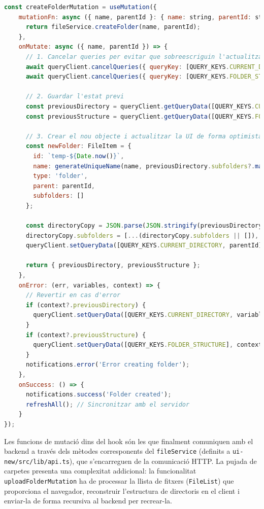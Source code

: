 \begin{lstlisting}[language=javascript, caption={Implementació d'una mutació optimista a `useFileOperations.ts`}]
const createFolderMutation = useMutation({
    mutationFn: async ({ name, parentId }: { name: string, parentId: string }) => {
      return fileService.createFolder(name, parentId);
    },
    onMutate: async ({ name, parentId }) => {
      // 1. Cancelar queries per evitar que sobreescriguin l'actualització optimista
      await queryClient.cancelQueries({ queryKey: [QUERY_KEYS.CURRENT_DIRECTORY, parentId] });
      await queryClient.cancelQueries({ queryKey: [QUERY_KEYS.FOLDER_STRUCTURE] });
      
      // 2. Guardar l'estat previ
      const previousDirectory = queryClient.getQueryData([QUERY_KEYS.CURRENT_DIRECTORY, parentId]) as FileItem;
      const previousStructure = queryClient.getQueryData([QUERY_KEYS.FOLDER_STRUCTURE]);
      
      // 3. Crear el nou objecte i actualitzar la UI de forma optimista
      const newFolder: FileItem = {
        id: `temp-${Date.now()}`,
        name: generateUniqueName(name, previousDirectory.subfolders?.map((f: FileItem) => f.name) || [], name, true),
        type: 'folder',
        parent: parentId,
        subfolders: []
      };

      const directoryCopy = JSON.parse(JSON.stringify(previousDirectory));
      directoryCopy.subfolders = [...(directoryCopy.subfolders || []), newFolder];
      queryClient.setQueryData([QUERY_KEYS.CURRENT_DIRECTORY, parentId], directoryCopy);
      
      return { previousDirectory, previousStructure };
    },
    onError: (err, variables, context) => {
      // Revertir en cas d'error
      if (context?.previousDirectory) {
        queryClient.setQueryData([QUERY_KEYS.CURRENT_DIRECTORY, variables.parentId], context.previousDirectory);
      }
      if (context?.previousStructure) {
        queryClient.setQueryData([QUERY_KEYS.FOLDER_STRUCTURE], context.previousStructure);
      }
      notifications.error('Error creating folder');
    },
    onSuccess: () => {
      notifications.success('Folder created');
      refreshAll(); // Sincronitzar amb el servidor
    }
});
\end{lstlisting}

Les funcions de mutació dins del hook són les que finalment comuniquen amb el backend a través dels mètodes corresponents del \texttt{fileService} (definits a \texttt{ui-new/src/lib/api.ts}), que s'encarreguen de la comunicació HTTP. La pujada de carpetes presenta una complexitat addicional: la funcionalitat \texttt{uploadFolderMutation} ha de processar la llista de fitxers (\texttt{FileList}) que proporciona el navegador, reconstruir l'estructura de directoris en el client i enviar-la de forma recursiva al backend per recrear-la.

